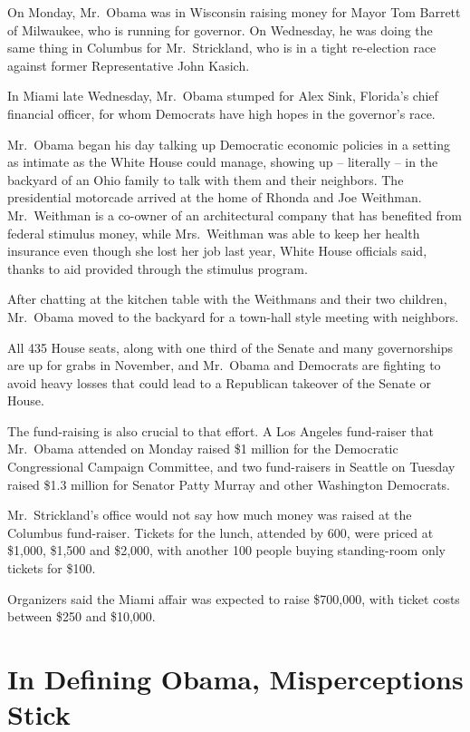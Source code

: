 ﻿\documentclass[12pt]{article}
\begin{document}
On Monday, Mr.~Obama was in Wisconsin raising money for Mayor Tom Barrett of Milwaukee, who is
running for governor. On Wednesday, he was doing the same thing in Columbus for Mr.~Strickland, who
is in a tight re-election race against former Representative John Kasich.

In Miami late Wednesday, Mr.~Obama stumped for Alex Sink, Florida's chief financial officer, for
whom Democrats have high hopes in the governor's race.

Mr.~Obama began his day talking up Democratic economic policies in a setting as intimate as the
White House could manage, showing up -- literally -- in the backyard of an Ohio family to talk with
them and their neighbors. The presidential motorcade arrived at the home of Rhonda and Joe Weithman.
Mr.~Weithman is a co-owner of an architectural company that has benefited from federal stimulus
money, while Mrs.~Weithman was able to keep her health insurance even though she lost her job last
year, White House officials said, thanks to aid provided through the stimulus program.

After chatting at the kitchen table with the Weithmans and their two children, Mr.~Obama moved to
the backyard for a town-hall style meeting with neighbors.

All 435 House seats, along with one third of the Senate and many governorships are up for grabs in
November, and Mr.~Obama and Democrats are fighting to avoid heavy losses that could lead to a
Republican takeover of the Senate or House.

The fund-raising is also crucial to that effort. A Los Angeles fund-raiser that Mr.~Obama attended
on Monday raised \$1 million for the Democratic Congressional Campaign Committee, and two
fund-raisers in Seattle on Tuesday raised \$1.3 million for Senator Patty Murray and other
Washington Democrats.

Mr.~Strickland's office would not say how much money was raised at the Columbus fund-raiser. Tickets
for the lunch, attended by 600, were priced at \$1,000, \$1,500 and \$2,000, with another 100 people
buying standing-room only tickets for \$100.

Organizers said the Miami affair was expected to raise \$700,000, with ticket costs between \$250
and \$10,000.

\section{In Defining Obama, Misperceptions Stick}
\end{document}
